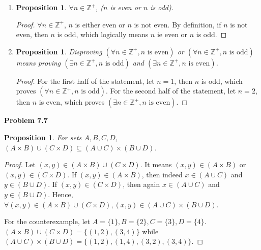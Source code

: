 \documentclass{article}
\newtheorem{prop}[thm]{Proposition}
\begin{document}
\begin{enumerate}[label={(\roman*)}]
    \item 
    \begin{prop}
        $\forall n \in \mathbb{Z^+}$, ($n$ is even or $n$ is odd).
    \end{prop}
    \begin{proof}
        $\forall n \in \mathbb{Z^+}$, $n$ is either even or $n$ is not even. 
        By definition, if $n$ is not even, then $n$ is odd, which logically means $n$ ie even or $n$ is odd.
    \end{proof}

    \item 
    \begin{prop}
        Disproving $(\forall n \in \mathbb{Z^+}, n \text{ is even})$ or $(\forall n \in \mathbb{Z^+}, n \text{ is odd})$ means proving $(\exists n \in \mathbb{Z^+}, n \text{ is odd})$ and $(\exists n \in \mathbb{Z^+}, n \text{ is even})$.
    \end{prop}
    \begin{proof}
        For the first half of the statement, let $n = 1$, then $n$ is odd, which proves $(\forall n \in \mathbb{Z^+}, n \text{ is odd})$. 
        For the second half of the statement, let $n = 2$, then $n$ is even, which proves $(\exists n \in \mathbb{Z^+}, n \text{ is even})$.
    \end{proof}
\end{enumerate}
\bigbreak

\textbf{Problem 7.7}
\begin{prop}
    For sets $A, B, C, D$, $(A \times B) \cup (C \times D) \subseteq (A \cup C) \times (B \cup D)$.
\end{prop}
\begin{proof}
    Let $(x, y) \in (A \times B) \cup (C \times D)$. It means $(x,y) \in (A \times B)$ or $(x,y) \in (C \times D)$. 
    If $(x,y) \in (A \times B)$, then indeed $x \in (A \cup C)$ and $y \in (B \cup D)$.
    If $(x,y) \in (C \times D)$, then again $x \in (A \cup C)$ and $y \in (B \cup D)$.
    Hence, $\forall (x,y) \in (A \times B) \cup (C \times D), (x,y) \in (A \cup C) \times (B \cup D)$.

    For the counterexample, let $A=\{1\},B=\{2\},C=\{3\},D=\{4\}$. 
    $(A \times B) \cup (C \times D) = \{(1,2),(3,4)\}$ while $(A \cup C) \times (B \cup D) = \{(1,2),(1,4),(3,2),(3,4)\}$.
\end{proof}
\bigbreak
\end{document}
